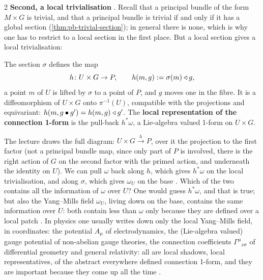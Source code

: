 \begin{paracol}{2}
\textbf{Second, a local trivialisation} . Recall that a principal bundle of the form $M\times G$ is trivial, and that a principal bundle is trivial if and only if it has a global section (\cref{thm:pb-trivial-section}); in general there is none, which is why one has to restrict to a local section in the first place. But a local section gives a local trivialisation:
\begin{definition}\label{def:ym-triv}
The section $\sigma$ defines the map
\[
  h\colon U\times G\to P,\qquad h(m,g):=\sigma(m)\mathbin{\triangleleft} g ,
\]
a point $m$ of $U$ is lifted by $\sigma$ to a point of $P$, and $g$ moves one in the fibre. It is a diffeomorphism of $U\times G$ onto $\pi^{-1}(U)$, compatible with the projections and equivariant: $h(m,g\bullet g')=h(m,g)\mathbin{\triangleleft} g'$. The \textbf{local representation of the connection 1-form} is the pull-back $h^*\omega$, a Lie-algebra valued 1-form on $U\times G$.      
\end{definition}
The lecture draws the full diagram: $U\times G\xrightarrow{\ h\ }P$, over it the projection to the first factor (not a principal bundle map, since only part of $P$ is involved, there is the right action of $G$ on the second factor with the primed action, and underneath the identity on $U$). We can pull $\omega$ back along $h$, which gives $h^*\omega$ on the local trivialisation, and along $\sigma$, which gives $\omega_U$ on the base   . Which of the two contains all the information of $\omega$ over $U$? One would guess $h^*\omega$, and that is true; but also the Yang--Mills field $\omega_U$, living down on the base, contains the same information over $U$: both contain less than $\omega$ only because they are defined over a local patch    . In physics one usually writes down only the local Yang--Mills field, in coordinates: the potential $A_\mu$ of electrodynamics, the (Lie-algebra valued) gauge potential of non-abelian gauge theories, the connection coefficients $\Gamma^\mu{}_{\nu\sigma}$ of differential geometry and general relativity: all are local shadows, local representatives, of the abstract everywhere defined connection 1-form, and they are important because they come up all the time    .


\end{paracol}

